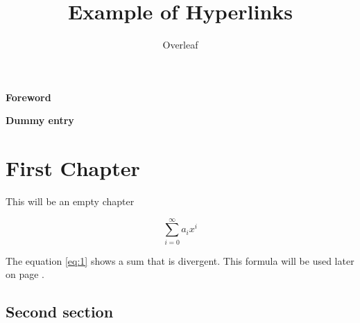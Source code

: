 \documentclass{book}
\title{Example of Hyperlinks}
\author{Overleaf}
\begin{document}

\frontmatter
\tableofcontents
\clearpage

{\huge {\bf Foreword}}

\Blindtext
\clearpage

{\huge {\bf Dummy entry}}

\Blindtext
\mainmatter

\chapter{First Chapter}

This will be an empty chapter

\begin{equation}
\label{eq:1}
\sum_{i=0}^{\infty} a_i x^i
\end{equation}

The equation \ref{eq:1} shows a sum that is divergent. This formula will be used later on page \pageref{second}.

\Blindtext
\clearpage

\section{Second section} \label{second}

\blindtext
\Blinddocument
\end{document}
